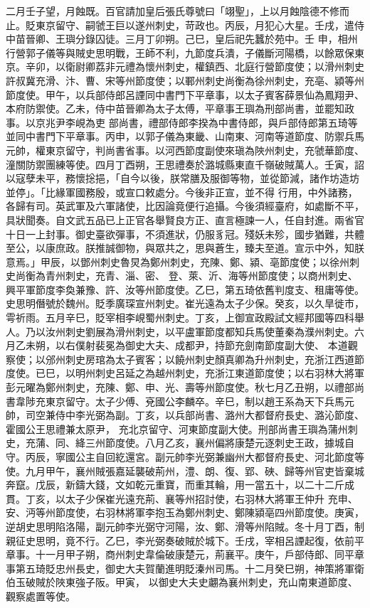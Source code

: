 \begin{pinyinscope}
 二月壬子望，月蝕既。百官請加皇后張氏尊號曰「翊聖」，上以月蝕陰德不修而止。貶東京留守、嗣虢王巨以遂州刺史，苛政也。丙辰，月犯心大星。壬戌，遣侍中苗晉卿、王璵分錄囚徒。三月丁卯朔。己巳，皇后祀先蠶於苑中。壬
 申，相州行營郭子儀等與賊史思明戰，王師不利，九節度兵潰，子儀斷河陽橋，以餘眾保東京。辛卯，以衛尉卿荔非元禮為懷州刺史，權鎮西、北庭行營節度使；以滑州刺史許叔冀充滑、汴、曹、宋等州節度使；以鄆州刺史尚衡為徐州刺史，充亳、潁等州節度使。甲午，以兵部侍郎呂諲同中書門下平章事，以太子賓客薛景仙為鳳翔尹、本府防禦使。乙未，侍中苗晉卿為太子太傅，平章事王璵為刑部尚書，並罷知政事。以京兆尹李峴為吏
 部尚書，禮部侍郎李揆為中書侍郎，與戶部侍郎第五琦等並同中書門下平章事。丙申，以郭子儀為東畿、山南東、河南等道節度、防禦兵馬元帥，權東京留守，判尚書省事。以河西節度副使來瑱為陜州刺史，充虢華節度、潼關防禦團練等使。四月丁酉朔，王思禮奏於潞城縣東直千嶺破賊萬人。壬寅，詔以寇孽未平，務懷捴挹，「自今以後，朕常膳及服御等物，並從節減，諸作坊造坊並停」。「比緣軍國務殷，或宣口敕處分。今後非正宣，並不得
 行用，中外諸務，各歸有司。英武軍及六軍諸使，比因論竟便行追攝。今後須經臺府，如處斷不平，具狀聞奏。自文武五品已上正官各舉賢良方正、直言極諫一人，任自封進。兩省官十日一上封事。御史臺欲彈事，不須進狀，仍服豸冠。殘妖未殄，國步猶難，共體至公，以康庶政。朕推誠御物，與眾共之，思與蒼生，臻夫至道。宣示中外，知朕意焉。」甲辰，以鄧州刺史魯炅為鄭州刺史，充陳、鄭、潁、亳節度使；以徐州刺史尚衡為青州刺史，充青、淄、密、
 登、萊、沂、海等州節度使；以商州刺史、興平軍節度李奐兼豫、許、汝等州節度使。乙巳，第五琦依舊判度支、租庸等使。史思明僭號於魏州。貶季廣琛宣州刺史。崔光遠為太子少保。癸亥，以久旱徙市，雩祈雨。五月辛巳，貶宰相李峴蜀州刺史。丁亥，上御宣政殿試文經邦國等四科舉人。乃以汝州刺史劉展為滑州刺史，以平盧軍節度都知兵馬使董秦為濮州刺史。六月乙未朔，以右僕射裴冕為御史大夫、成都尹，持節充劍南節度副大使、
 本道觀察使；以邠州刺史房琯為太子賓客；以饒州刺史顏真卿為升州刺史，充浙江西道節度使。已巳，以明州刺史呂延之為越州刺史，充浙江東道節度使；以右羽林大將軍彭元曜為鄭州刺史，充陳、鄭、申、光、壽等州節度使。秋七月乙丑朔，以禮部尚書韋陟充東京留守。太子少傅、兗國公李麟卒。辛巳，制以趙王系為天下兵馬元帥，司空兼侍中李光弼為副。丁亥，以兵部尚書、潞州大都督府長史、潞沁節度、霍國公王思禮兼太原尹，
 充北京留守、河東節度副大使。刑部尚書王璵為蒲州刺史，充蒲、同、絳三州節度使。八月乙亥，襄州偏將康楚元逐刺史王政，據城自守。丙辰，寧國公主自回紇還宮。副元帥李光弼兼幽州大都督府長史、河北節度等使。九月甲午，襄州賊張嘉延襲破荊州，澧、朗、復、郢、硤、歸等州官吏皆棄城奔竄。戊辰，新鑄大錢，文如乾元重寶，而重其輪，用一當五十，以二十二斤成貫。丁亥，以太子少保崔光遠充荊、襄等州招討使，右羽林大將軍王仲升
 充申、安、沔等州節度使，右羽林將軍李抱玉為鄭州刺史、鄭陳潁亳四州節度使。庚寅，逆胡史思明陷洛陽，副元帥李光弼守河陽，汝、鄭、滑等州陷賊。冬十月丁酉，制親征史思明，竟不行。乙巳，李光弼奏破賊於城下。壬戌，宰相呂諲起復，依前平章事。十一月甲子朔，商州刺史韋倫破康楚元，荊襄平。庚午，戶部侍郎、同平章事第五琦貶忠州長史，御史大夫賀蘭進明貶溱州司馬。十二月癸巳朔，神策將軍衛伯玉破賊於陜東強子阪。甲寅，
 以御史大夫史翽為襄州刺史，充山南東道節度、觀察處置等使。




\end{pinyinscope}
